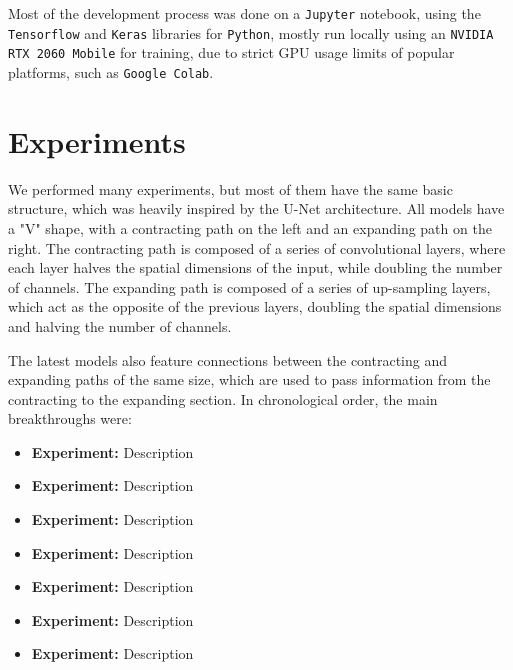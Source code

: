 \documentclass[11pt]{article}
\begin{document}
\begin{multicols}{2}

      Most of the development process was done on a \texttt{Jupyter} notebook, using the \texttt{Tensorflow}\cite{TensorFlow} and \texttt{Keras}\cite{chollet2015keras} libraries for \texttt{Python}, mostly run locally using an \texttt{NVIDIA RTX 2060 Mobile} for training, due to strict GPU usage limits of popular platforms, such as \texttt{Google Colab}.

      \label{sec:experiments}
      \section{Experiments}
      We performed many experiments, but most of them have the same basic structure, which was heavily inspired by the U-Net architecture. All models have a "V" shape, with a contracting path on the left and an expanding path on the right. The contracting path is composed of a series of convolutional layers, where each layer halves the spatial dimensions of the input, while doubling the number of channels. The expanding path is composed of a series of up-sampling layers, which act as the opposite of the previous layers, doubling the spatial dimensions and halving the number of channels.

      The latest models also feature connections between the contracting and expanding paths of the same size, which are used to pass information from the contracting to the expanding section. In chronological order, the main breakthroughs were:
      \begin{itemize}[leftmargin=*]
            \setlength\itemsep{0em}
            \item \textbf{Experiment:} Description
            \item \textbf{Experiment:} Description
            \item \textbf{Experiment:} Description
            \item \textbf{Experiment:} Description
            \item \textbf{Experiment:} Description
            \item \textbf{Experiment:} Description
            \item \textbf{Experiment:} Description
      \end{itemize}


\end{multicols}
\end{document}
